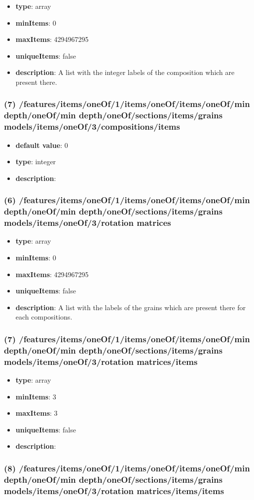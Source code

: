 \begin{itemize}[leftmargin=6em]\item {\bf type}: array
\item {\bf minItems}: 0
\item {\bf maxItems}: 4294967295
\item {\bf uniqueItems}: false
\item {\bf description}: A list with the integer labels of the composition which are present there.
\end{itemize}\subsubsection{(7) /features/items/oneOf/1/items/oneOf/items/oneOf/min depth/oneOf/min depth/oneOf/sections/items/grains models/items/oneOf/3/compositions/items}
\begin{itemize}[leftmargin=7em]\item {\bf default value}: 0
\item {\bf type}: integer
\item {\bf description}: 
\end{itemize}\subsubsection{(6) /features/items/oneOf/1/items/oneOf/items/oneOf/min depth/oneOf/min depth/oneOf/sections/items/grains models/items/oneOf/3/rotation matrices}
\begin{itemize}[leftmargin=6em]\item {\bf type}: array
\item {\bf minItems}: 0
\item {\bf maxItems}: 4294967295
\item {\bf uniqueItems}: false
\item {\bf description}: A list with the labels of the grains which are present there for each compositions.
\end{itemize}\subsubsection{(7) /features/items/oneOf/1/items/oneOf/items/oneOf/min depth/oneOf/min depth/oneOf/sections/items/grains models/items/oneOf/3/rotation matrices/items}
\begin{itemize}[leftmargin=7em]\item {\bf type}: array
\item {\bf minItems}: 3
\item {\bf maxItems}: 3
\item {\bf uniqueItems}: false
\item {\bf description}: 
\end{itemize}\subsubsection{(8) /features/items/oneOf/1/items/oneOf/items/oneOf/min depth/oneOf/min depth/oneOf/sections/items/grains models/items/oneOf/3/rotation matrices/items/items}
